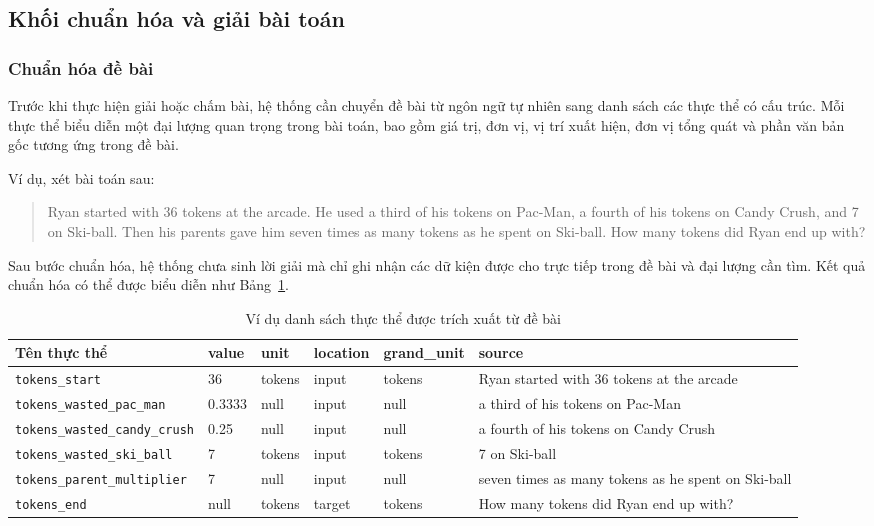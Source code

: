 \documentclass[12pt,a4paper]{article}
\begin{document}
\subsection{Khối chuẩn hóa và giải bài toán}

\subsubsection{Chuẩn hóa đề bài}

Trước khi thực hiện giải hoặc chấm bài, hệ thống cần chuyển đề bài từ ngôn ngữ tự nhiên sang danh sách các thực thể có cấu trúc. Mỗi thực thể biểu diễn một đại lượng quan trọng trong bài toán, bao gồm giá trị, đơn vị, vị trí xuất hiện, đơn vị tổng quát và phần văn bản gốc tương ứng trong đề bài.

Ví dụ, xét bài toán sau:

\begin{quote}
Ryan started with 36 tokens at the arcade. He used a third of his tokens on Pac-Man, a fourth of his tokens on Candy Crush, and 7 on Ski-ball. Then his parents gave him seven times as many tokens as he spent on Ski-ball. How many tokens did Ryan end up with?
\end{quote}

Sau bước chuẩn hóa, hệ thống chưa sinh lời giải mà chỉ ghi nhận các dữ kiện được cho trực tiếp trong đề bài và đại lượng cần tìm. Kết quả chuẩn hóa có thể được biểu diễn như Bảng~\ref{tab:problem-entities-example}.

\begin{table}[ht]
\centering
\caption{Ví dụ danh sách thực thể được trích xuất từ đề bài}
\label{tab:problem-entities-example}
\small
\begin{tabular}{|p{3.2cm}|p{1.1cm}|p{1.3cm}|p{1.5cm}|p{1.5cm}|p{4.8cm}|}
\hline
\textbf{Tên thực thể} & \textbf{value} & \textbf{unit} & \textbf{location} & \textbf{grand\_unit} & \textbf{source} \\
\hline
\texttt{tokens\_start} & 36 & tokens & input & tokens & Ryan started with 36 tokens at the arcade \\
\hline
\texttt{tokens\_wasted\_pac\_man} & 0.3333 & null & input & null & a third of his tokens on Pac-Man \\
\hline
\texttt{tokens\_wasted\_candy\_crush} & 0.25 & null & input & null & a fourth of his tokens on Candy Crush \\
\hline
\texttt{tokens\_wasted\_ski\_ball} & 7 & tokens & input & tokens & 7 on Ski-ball \\
\hline
\texttt{tokens\_parent\_multiplier} & 7 & null & input & null & seven times as many tokens as he spent on Ski-ball \\
\hline
\texttt{tokens\_end} & null & tokens & target & tokens & How many tokens did Ryan end up with? \\
\hline
\end{tabular}
\end{table}
\end{document}
